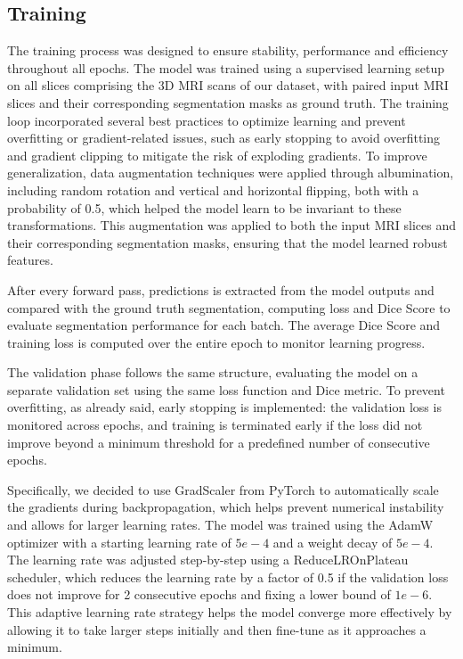 \documentclass[10pt,twocolumn,letterpaper]{article}
\begin{document}
\subsection{Training}
The training process was designed to ensure stability, performance and efficiency throughout all epochs. The model was trained using a supervised learning setup on all slices comprising the 3D MRI scans of our dataset, with paired input MRI slices and their corresponding segmentation masks as ground truth. The training loop incorporated several best practices to optimize learning and prevent overfitting or gradient-related issues, such as early stopping to avoid overfitting and gradient clipping to mitigate the risk of exploding gradients. To improve generalization, data augmentation techniques were applied through albumination, including random rotation and vertical and horizontal flipping, both with a probability of 0.5, which helped the model learn to be invariant to these transformations. This augmentation was applied to both the input MRI slices and their corresponding segmentation masks, ensuring that the model learned robust features.

After every forward pass, predictions is extracted from the model outputs and compared with the ground truth segmentation, computing loss and Dice Score to evaluate segmentation performance for each batch. The average Dice Score and training loss is computed over the entire epoch to monitor learning progress.

The validation phase follows the same structure, evaluating the model on a separate validation set using the same loss function and Dice metric.
To prevent overfitting, as already said, early stopping is implemented: the validation loss is monitored across epochs, and training is terminated early if the loss did not improve beyond a minimum threshold for a predefined number of consecutive epochs.

Specifically, we decided to use GradScaler from PyTorch to automatically scale the gradients during backpropagation, which helps prevent numerical instability and allows for larger learning rates. The model was trained using the AdamW optimizer with a starting learning rate of $5e-4$ and a weight decay of $5e-4$. The learning rate was adjusted step-by-step using a ReduceLROnPlateau scheduler, which reduces the learning rate by a factor of 0.5 if the validation loss does not improve for 2 consecutive epochs and fixing a lower bound of $1e-6$. This adaptive learning rate strategy helps the model converge more effectively by allowing it to take larger steps initially and then fine-tune as it approaches a minimum.
\end{document}
